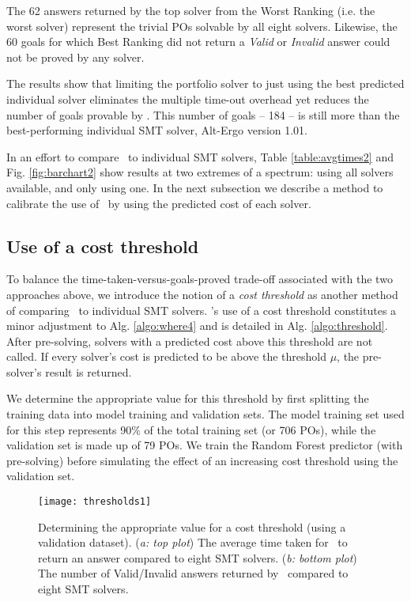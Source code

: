 The 62  answers returned by the top solver from the \textsf{Worst Ranking} (i.e. the worst solver) represent the trivial POs solvable by all eight solvers. 
Likewise, the 60 goals for which \textsf{Best Ranking} did not return a \textit{Valid} or \textit{Invalid} answer could not be proved by any solver.

The results show that limiting the portfolio solver to just using the best predicted individual solver eliminates the multiple time-out overhead yet reduces the number of goals provable by \where.
This number of goals -- 184 -- is still more than the best-performing individual SMT solver, Alt-Ergo version 1.01.  

In an effort to compare \where~to individual SMT solvers, Table \ref{table:avgtimes2} and Fig. \ref{fig:barchart2} show results at two extremes of a spectrum: using all solvers available, and only using one.
In the next subsection we describe a method to calibrate the use of \where~by using the predicted cost of each solver. 


\subsection{Use of a cost threshold}
\label{sub:threshold}

To balance the time-taken-versus-goals-proved trade-off associated with the two approaches above, we introduce the notion of a \textit{cost threshold} as another method of comparing \where~to individual SMT solvers.
\where's use of a cost threshold constitutes a minor adjustment to Alg. \ref{algo:where4} and is detailed in Alg. \ref{algo:threshold}. 
After pre-solving, solvers with a predicted cost above this threshold are not called. 
If every solver's cost is predicted to be above the threshold $\mu$, the pre-solver's result is returned.

We determine the appropriate value for this threshold by first splitting the training data into model training and validation sets.
The model training set used for this step represents 90\% of the total training set (or 706 POs), while the validation set is made up of 79 POs. 
We train the Random Forest predictor (with pre-solving) before simulating the effect of an increasing cost threshold using the validation set.

\begin{figure}
	\centering
	\texttt{[image: thresholds1]}
	\caption[Determining a cost threshold]{Determining the appropriate value for a cost threshold (using a validation dataset). (\textit{a: top plot}) The average time taken for \where~to return an answer compared to eight SMT solvers. (\textit{b: bottom plot}) The number of Valid/Invalid answers returned by \where~compared to eight SMT solvers.}
	\label{fig:thresholds1}
\end{figure}  



